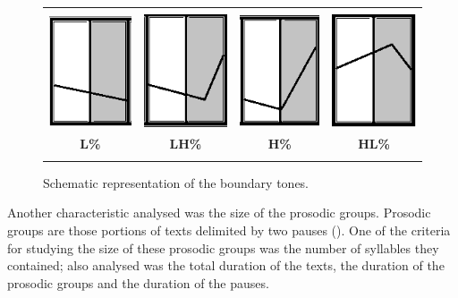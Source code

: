 \documentclass[output=paper]{langsci/langscibook}
\begin{document}
\begin{figure}
\setlength{\tabcolsep}{12pt} 
 \begin{tabularx}{\textwidth}{CCCC}
 \lsptoprule \\
\includegraphics[scale=0.7]{figures/GAM-img1.png} & \includegraphics[scale=0.7]{figures/GAM-img2.png} & \includegraphics[scale=0.7]{figures/GAM-img3.png} & \includegraphics[scale=0.7]{figures/GAM-img4.png} \\
 \bfseries L\% & \bfseries LH\% & \bfseries H\% & \bfseries HL\%  \\
\lspbottomrule
\end{tabularx}
\caption{Schematic representation of the boundary tones.}
\label{fig:gam:1}
\end{figure}

  Another characteristic analysed was the size of the prosodic groups. Prosodic groups are those portions of texts delimited by two pauses (\citealt{Gaminde.2010,Gaminde.2012,Gaminde.2015}). One of the criteria for studying the size of these prosodic groups was the number of syllables they contained; also analysed was the total duration of the texts, the duration of the prosodic groups and the duration of the pauses.
\end{document}
